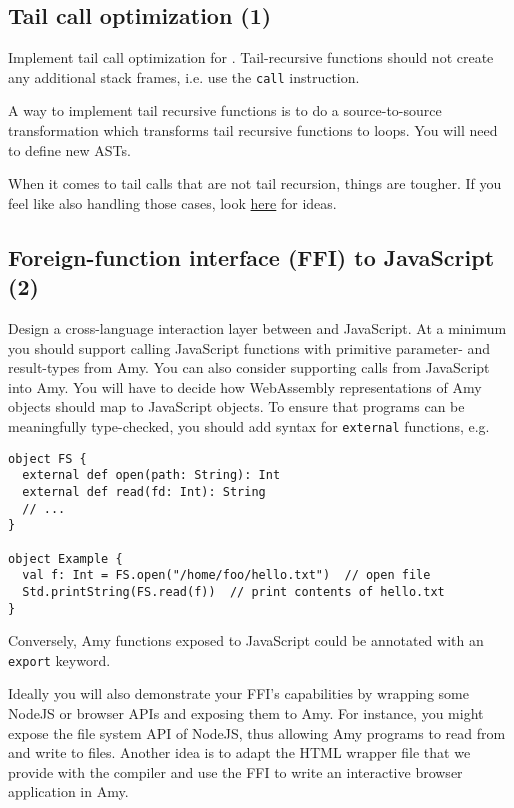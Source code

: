 \subsection{Tail call optimization (1)}
Implement tail call optimization for \langname.
Tail-recursive functions should not create any additional stack frames,
i.e. use the \lstinline{call} instruction.

A way to implement tail recursive functions is to do a source-to-source transformation
which transforms tail recursive functions to loops. You will need to define new ASTs.

When it comes to tail calls that are not tail recursion,
things are tougher. If you feel like also handling those cases,
look \href{https://cs420.epfl.ch/archive/18/s/acc18_10_tail-calls.pdf}{here} for ideas.

\subsection{Foreign-function interface (FFI) to JavaScript (2)}
Design a cross-language interaction layer between \langname and JavaScript.
At a minimum you should support calling JavaScript functions with primitive parameter- and
result-types from Amy.  You can also consider supporting calls from JavaScript into Amy.
You will have to decide how WebAssembly representations of Amy objects should map to
JavaScript objects.
To ensure that programs can be meaningfully type-checked, you should add syntax for
\lstinline{external} functions, e.g.

\begin{lstlisting}
object FS {
  external def open(path: String): Int
  external def read(fd: Int): String
  // ...
}

object Example {
  val f: Int = FS.open("/home/foo/hello.txt")  // open file
  Std.printString(FS.read(f))  // print contents of hello.txt
}
\end{lstlisting}

Conversely, Amy functions exposed to JavaScript could be annotated with an \lstinline{export}
keyword.

Ideally you will also demonstrate your FFI's capabilities by wrapping some NodeJS or browser
APIs and exposing them to Amy.
For instance, you might expose the file system API of NodeJS, thus allowing Amy programs to
read from and write to files.
Another idea is to adapt the HTML wrapper file that we provide with the compiler and use the
FFI to write an interactive browser application in Amy.

